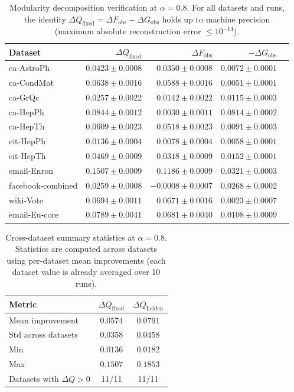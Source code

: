 \documentclass[10pt,journal,compsoc]{IEEEtran}
\begin{document}
\begin{table}[t]
\centering
\caption{Modularity decomposition verification at $\alpha = 0.8$.
For all datasets and runs, the identity $\Delta Q_{\mathrm{fixed}} = \Delta F_{\mathrm{obs}} - \Delta G_{\mathrm{obs}}$ holds up to machine precision (maximum absolute reconstruction error $\le 10^{-14}$).}

\label{tab:exp1_2_decomposition}
\begin{tabular}{lrrrr}
\toprule
Dataset & $\Delta Q_{\mathrm{fixed}}$ & $\Delta F_{\mathrm{obs}}$ & $-\Delta G_{\mathrm{obs}}$  \\
\midrule
ca-AstroPh & $0.0423 \pm 0.0008$ & $0.0350 \pm 0.0008$ & $0.0072 \pm 0.0001$  \\
ca-CondMat & $0.0638 \pm 0.0016$ & $0.0588 \pm 0.0016$ & $0.0051 \pm 0.0001$ \\
ca-GrQc & $0.0257 \pm 0.0022$ & $0.0142 \pm 0.0022$ & $0.0115 \pm 0.0003$ \\
ca-HepPh & $0.0844 \pm 0.0012$ & $0.0030 \pm 0.0011$ & $0.0814 \pm 0.0002$ \\
ca-HepTh & $0.0609 \pm 0.0023$ & $0.0518 \pm 0.0023$ & $0.0091 \pm 0.0003$  \\
cit-HepPh & $0.0136 \pm 0.0004$ & $0.0078 \pm 0.0004$ & $0.0058 \pm 0.0001$ \\
cit-HepTh & $0.0469 \pm 0.0009$ & $0.0318 \pm 0.0009$ & $0.0152 \pm 0.0001$  \\
email-Enron & $0.1507 \pm 0.0009$ & $0.1186 \pm 0.0009$ & $0.0321 \pm 0.0003$  \\
facebook-combined & $0.0259 \pm 0.0008$ & $-0.0008 \pm 0.0007$ & $0.0268 \pm 0.0002$  \\
wiki-Vote & $0.0694 \pm 0.0011$ & $0.0671 \pm 0.0016$ & $0.0023 \pm 0.0007$  \\
email-Eu-core & $0.0789 \pm 0.0041$ & $0.0681 \pm 0.0040$ & $0.0108 \pm 0.0009$ \\
\bottomrule
\end{tabular}
\end{table}

\begin{table}[htbp]
\centering
\caption{Cross-dataset summary statistics at $\alpha = 0.8$.
Statistics are computed across datasets using per-dataset mean improvements (each dataset value is already averaged over 10 runs).}

\label{tab:exp1_2_summary}
\begin{tabular}{lcc}
\toprule
Metric & $\Delta Q_{\mathrm{fixed}}$ & $\Delta Q_{\mathrm{Leiden}}$ \\
\midrule
Mean improvement & $0.0574$ & $0.0791$ \\
Std across datasets & $0.0358$ & $0.0458$ \\
Min & $0.0136$ & $0.0182$ \\
Max & $0.1507$ & $0.1853$ \\
Datasets with $\Delta Q > 0$ & 11/11 & 11/11 \\
\bottomrule
\end{tabular}
\end{table}
\end{document}
